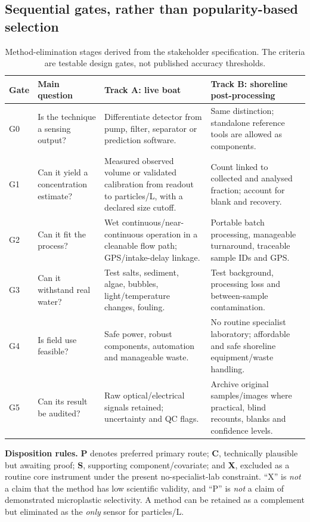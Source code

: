 \documentclass[10pt,a4paper]{article}
\begin{document}
\subsection{Sequential gates, rather than popularity-based selection}
\begin{table}[H]\centering\footnotesize
\caption{Method-elimination stages derived from the stakeholder specification. The criteria are testable design gates, not published accuracy thresholds.}\label{tab:selection_gates}
\begin{tabularx}{\linewidth}{@{}L{0.95cm}L{2.7cm}YY@{}}\toprule
{}\textbf{Gate} & \textbf{Main question} & \textbf{Track A: live boat} & \textbf{Track B: shoreline post-processing} \\\midrule
G0 & Is the technique a sensing output? & Differentiate detector from pump, filter, separator or prediction software. & Same distinction; standalone reference tools are allowed as components.\\
G1 & Can it yield a concentration estimate? & Measured observed volume or validated calibration from readout to particles/L, with a declared size cutoff. & Count linked to collected and analysed fraction; account for blank and recovery.\\
G2 & Can it fit the process? & Wet continuous/near-continuous operation in a cleanable flow path; GPS/intake-delay linkage. & Portable batch processing, manageable turnaround, traceable sample IDs and GPS.\\
G3 & Can it withstand real water? & Test salts, sediment, algae, bubbles, light/temperature changes, fouling. & Test background, processing loss and between-sample contamination.\\
G4 & Is field use feasible? & Safe power, robust components, automation and manageable waste. & No routine specialist laboratory; affordable and safe shoreline equipment/waste handling.\\
G5 & Can its result be audited? & Raw optical/electrical signals retained; uncertainty and QC flags. & Archive original samples/images where practical, blind recounts, blanks and confidence levels.\\
\bottomrule\end{tabularx}
\end{table}

\textbf{Disposition rules.} \textbf{P} denotes preferred primary route; \textbf{C}, technically plausible but awaiting proof; \textbf{S}, supporting component/covariate; and \textbf{X}, excluded as a routine core instrument under the present no-specialist-lab constraint. ``X'' is \emph{not} a claim that the method has low scientific validity, and ``P'' is \emph{not} a claim of demonstrated microplastic selectivity. A method can be retained as a complement but eliminated as the \emph{only} sensor for particles/L.
\end{document}
